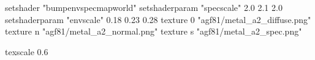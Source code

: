 setshader "bumpenvspecmapworld"
setshaderparam "specscale" 2.0 2.1 2.0
setshaderparam "envscale"  0.18 0.23 0.28
   texture 0 "agf81/metal_a2_diffuse.png"
   texture n "agf81/metal_a2_normal.png"
   texture s "agf81/metal_a2_spec.png"

texscale 0.6
